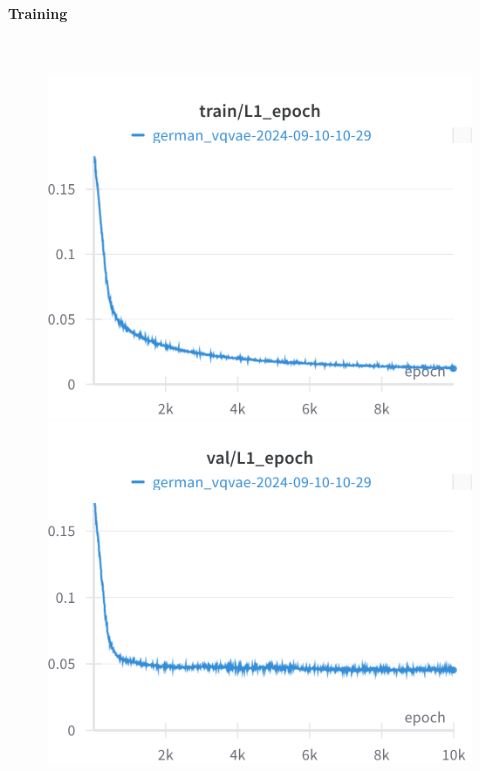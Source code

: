 \paragraph{Training}\mbox{}\\

\begin{figure}[H]
\includegraphics[width=\linewidth]{detailed_engineering/German VQVAE/charts/train_l1.png}
\caption{}
\endminipage\hfill
{}
\includegraphics[width=\linewidth]{detailed_engineering/German VQVAE/charts/val_l1.png}
\caption{}
\endminipage
\end{figure}

